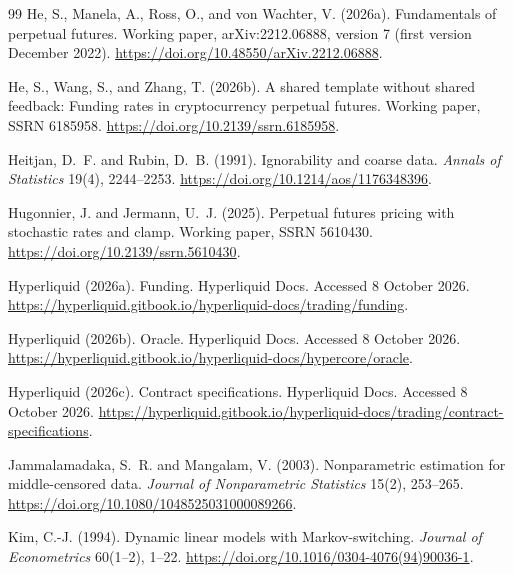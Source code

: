 \documentclass[10pt,a4paper]{article}
\begin{document}
\begin{thebibliography}{99}
He, S., Manela, A., Ross, O., and von Wachter, V. (2026a).
\newblock Fundamentals of perpetual futures.
\newblock Working paper, arXiv:2212.06888, version 7 (first version December 2022).
\newblock \url{https://doi.org/10.48550/arXiv.2212.06888}.

He, S., Wang, S., and Zhang, T. (2026b).
\newblock A shared template without shared feedback: Funding rates in cryptocurrency perpetual futures.
\newblock Working paper, SSRN 6185958.
\newblock \url{https://doi.org/10.2139/ssrn.6185958}.

Heitjan, D.~F. and Rubin, D.~B. (1991).
\newblock Ignorability and coarse data.
\newblock \textit{Annals of Statistics} 19(4), 2244--2253.
\newblock \url{https://doi.org/10.1214/aos/1176348396}.

Hugonnier, J. and Jermann, U.~J. (2025).
\newblock Perpetual futures pricing with stochastic rates and clamp.
\newblock Working paper, SSRN 5610430.
\newblock \url{https://doi.org/10.2139/ssrn.5610430}.

Hyperliquid (2026a).
\newblock Funding. Hyperliquid Docs. Accessed 8 October 2026.
\newblock \url{https://hyperliquid.gitbook.io/hyperliquid-docs/trading/funding}.

Hyperliquid (2026b).
\newblock Oracle. Hyperliquid Docs. Accessed 8 October 2026.
\newblock \url{https://hyperliquid.gitbook.io/hyperliquid-docs/hypercore/oracle}.

Hyperliquid (2026c).
\newblock Contract specifications. Hyperliquid Docs. Accessed 8 October 2026.
\newblock \url{https://hyperliquid.gitbook.io/hyperliquid-docs/trading/contract-specifications}.

Jammalamadaka, S.~R. and Mangalam, V. (2003).
\newblock Nonparametric estimation for middle-censored data.
\newblock \textit{Journal of Nonparametric Statistics} 15(2), 253--265.
\newblock \url{https://doi.org/10.1080/1048525031000089266}.

Kim, C.-J. (1994).
\newblock Dynamic linear models with Markov-switching.
\newblock \textit{Journal of Econometrics} 60(1--2), 1--22.
\newblock \url{https://doi.org/10.1016/0304-4076(94)90036-1}.


\end{thebibliography}
\end{document}
